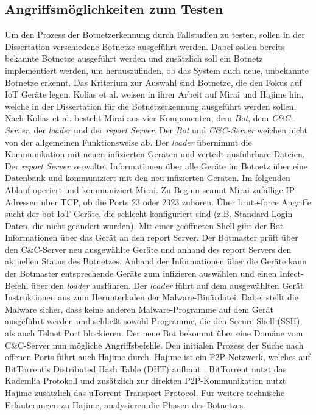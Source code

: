 \subsection*{Angriffsmöglichkeiten zum Testen}
Um den Prozess der Botnetzerkennung durch Fallstudien zu testen, sollen in der Dissertation verschiedene Botnetze ausgeführt werden. Dabei sollen bereits bekannte Botnetze ausgeführt werden und
zusätzlich soll ein Botnetz implementiert werden, um herauszufinden, ob das System auch neue, unbekannte Botnetze erkennt. Das Kriterium zur Auswahl sind Botnetze, die den Fokus auf IoT Geräte legen.
Kolias et al. \cite{DBLP:journals/computer/KoliasKSV17} weisen in ihrer Arbeit auf Mirai und Hajime hin, welche in der Dissertation für die Botnetzerkennung ausgeführt werden sollen.
Nach Kolias et al. besteht Mirai aus vier Komponenten, dem \textit{Bot}, dem \textit{C\&C-Server}, der \textit{loader} und der \textit{report Server}. 
Der \textit{Bot} und \textit{C\&C-Server} weichen nicht von der allgemeinen Funktionsweise ab. Der \textit{loader} übernimmt die Kommunikation mit neuen infizierten 
Geräten und verteilt ausführbare Dateien. Der \textit{report Server} verwaltet Informationen über alle Geräte im Botnetz über eine Datenbank und kommuniziert mit den neu infizierten Geräten. 
Im folgenden Ablauf operiert und kommuniziert Mirai. Zu Beginn scannt Mirai zufällige IP-Adressen über TCP, ob die Ports 23 oder 2323 zuhören. Über brute-force Angriffe sucht der bot IoT Geräte, die
schlecht konfiguriert sind (z.B. Standard Login Daten, die nicht geändert wurden). Mit einer geöffneten Shell gibt der Bot Informationen über das Gerät an den report Server. Der Botmaster prüft über
den C\&C-Server neu ausgewählte Geräte und anhand des report Servers den aktuellen Status des Botnetzes. Anhand der Informationen über die Geräte kann der Botmaster entsprechende Geräte zum
infizieren auswählen und einen Infect-Befehl über den \textit{loader} ausführen. Der \textit{loader} führt auf dem ausgewählten Gerät Instruktionen aus zum Herunterladen der Malware-Binärdatei. Dabei
stellt die Malware sicher, dass keine anderen Malware-Programme auf dem Gerät ausgeführt werden und schließt sowohl Programme, die den Secure Shell (SSH), als auch Telnet Port blockieren. Der neue Bot
bekommt über eine Domäne vom C\&C-Server nun mögliche Angriffsbefehle. Den initialen Prozess der Suche nach offenen Ports führt auch Hajime durch. Hajime ist ein P2P-Netzwerk, welches auf
BitTorrent's Distributed Hash Table (DHT) aufbaut \cite{DBLP:conf/ndss/HerwigHHRL19,2017AnalyzingTP}. BitTorrent nutzt das Kademlia Protokoll \cite{DBLP:conf/iptps/MaymounkovM02} und zusätzlich zur
direkten P2P-Kommunikation nutzt Hajime zusätzlich das uTorrent Transport Protocol. Für weitere technische Erläuterungen zu Hajime, analysieren \cite{DBLP:conf/ndss/HerwigHHRL19} die Phasen
des Botnetzes.

